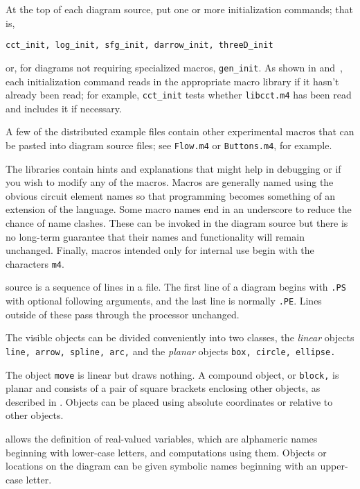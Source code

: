 At the top of each diagram source, put one or more initialization
commands; that is,

{\tt cct\_init, log\_init, sfg\_init, darrow\_init, threeD\_init}

\noindent
or, for diagrams not requiring specialized macros, {\tt gen\_init}.
As shown in  and~,
each initialization command reads in the appropriate macro
library if it hasn't already been read;
for example, {\tt cct\_init} tests whether {\tt libcct.m4} has been
read and includes it if necessary.

A few of the distributed example files contain other experimental macros
that can be pasted into diagram source files; see
{\tt Flow.m4} or {\tt Buttons.m4}, for example.

The libraries contain hints and explanations that might help in debugging
or if you wish to modify any of the macros.  Macros are generally named
using the obvious circuit element names so that programming becomes something
of an extension of the \pic language.  Some macro names end in an underscore
to reduce the chance of name clashes.  These can be invoked in the
diagram source but there is no long-term guarantee that their names and
functionality
will remain unchanged. Finally, macros intended only for internal use
begin with the characters {\tt m4}.


\Pic source is a sequence of lines in a file.
The first line of a diagram begins with {\tt .PS} with optional following
arguments, and the last line is normally {\tt .PE}.
Lines outside of these pass through the \pic processor unchanged.

The visible objects can be divided conveniently into two classes, the
{\em linear} objects {\tt line, arrow, spline, arc,} and the
{\em planar} objects {\tt box, circle, ellipse.}

The object {\tt move} is linear but draws nothing.  A compound object,
or {\tt block,} is planar and consists of a pair of square brackets enclosing
other objects, as described in .
Objects can be placed using absolute coordinates or relative to other objects.

\Pic allows the definition of real-valued variables, which are alphameric
names beginning with lower-case letters, and computations using them.
Objects or locations on the diagram can be given symbolic names
beginning with an upper-case letter.

